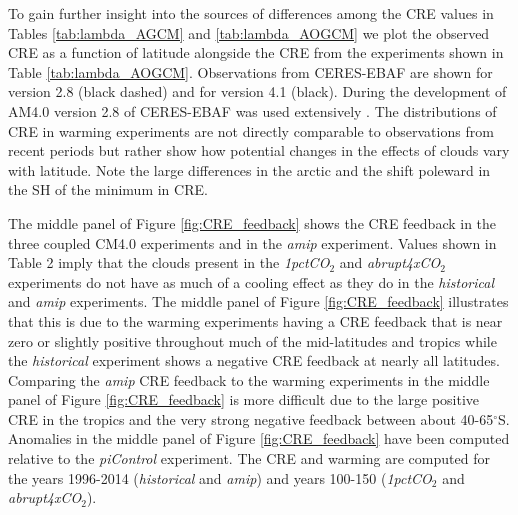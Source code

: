 \documentclass[draft]{agujournal2019}
\begin{document}
To gain further insight into the sources of differences among the CRE values in Tables  \ref{tab:lambda_AGCM}  and  
\ref{tab:lambda_AOGCM}  we plot the observed CRE as a function of latitude alongside the CRE from the 
experiments shown in Table  \ref{tab:lambda_AOGCM}.  Observations from CERES-EBAF are shown for version 
2.8 (black dashed) and for version 4.1 (black).  During the development of AM4.0 version 2.8 of CERES-EBAF was 
used extensively \cite{Zhao_etal_2018a}.  The distributions of CRE in warming experiments are not directly comparable 
to observations from recent periods but rather show how potential changes in the effects of clouds vary with latitude.   
Note the large differences in the arctic and the shift poleward in the SH of the minimum in CRE.    

The middle panel of Figure \ref{fig:CRE_feedback} shows the CRE feedback in the three coupled CM4.0 experiments and in the \textit{amip} experiment.  Values shown in Table 2 imply that the clouds present in the \textit{1pctCO$_2$} and \textit{abrupt4xCO$_2$} experiments
do not have as much of a cooling effect as they do in the \textit{historical} and \textit{amip} experiments.  The middle panel of Figure \ref{fig:CRE_feedback} illustrates that this is due to the warming experiments having a CRE feedback that is near zero or slightly positive throughout much of the mid-latitudes and tropics while the \textit{historical} experiment shows a negative CRE feedback at nearly all latitudes.  Comparing the \textit{amip} CRE feedback to the warming experiments in the 
middle panel of Figure \ref{fig:CRE_feedback} is more difficult due to the large positive CRE in the tropics and the very strong negative feedback between about 40-65$^{\circ}$S.  Anomalies in the middle panel of Figure \ref{fig:CRE_feedback} have been computed relative to the \textit{piControl} experiment.  The CRE and warming are 
computed for the years 1996-2014 (\textit{historical} and \textit{amip}) and years 100-150 (\textit{1pctCO$_2$} and \textit{abrupt4xCO$_2$}).   
\end{document}
